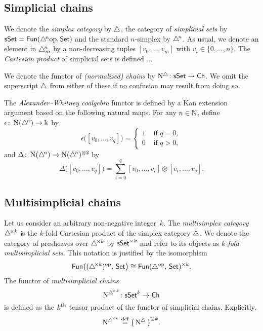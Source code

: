 \subsection{Simplicial chains}

We denote the \textit{simplex category} by $\triangle$, the category of \textit{simplicial sets} by $\mathsf{sSet} = \mathsf{Fun}(\triangle^{\!n}\mathrm{op}, \mathsf{Set})$ and the standard $n$-simplex by $\triangle^{\!n}$.
As usual, we denote an element in $\triangle^{\!n}_m$ by a non-decreasing tuples $[v_0, \dots, v_m]$ with $v_i \in \{0, \dots, n\}$.
The \textit{Cartesian product} of simplicial sets is defined ...


We denote the functor of \textit{(normalized) chains} by $\operatorname{N^{\triangle}} \colon \mathsf{sSet} \to \mathsf{Ch}$.
We omit the superscript $\triangle$ from either of these if no confusion may result from doing so.

The \textit{Alexander--Whitney coalgebra} functor is defined by a Kan extension argument based on the following natural maps.
For any $n \in \mathbb{N}$, define $\epsilon \colon \operatorname{N}(\triangle^{\!n}) \to \Bbbk$ by
\[
\epsilon \big( [v_0, \dots, v_q] \big) = \begin{cases} 1 & \text{ if } q = 0, \\ 0 & \text{ if } q>0, \end{cases}
\]
and $\Delta \colon \operatorname{N}(\triangle^{\!n}) \to \operatorname{N}(\triangle^{\!n})^{\otimes2}$ by
\[
\Delta \big( [v_0, \dots, v_q] \big) = \sum_{i=0}^q [v_0, \dots, v_i] \otimes [v_i, \dots, v_q].
\]

\subsection{Multisimplicial chains}

Let us consider an arbitrary non-negative integer~$k$.
The \textit{multisimplex category} $\triangle^{\! \times k}$ is the $k$-fold Cartesian product of the simplex category $\triangle$.
We denote the category of presheaves over $\triangle^{\! \times k}$ by $\mathsf{sSet}^{\times k}$ and refer to its objects as \textit{$k$-fold multisimplicial sets}.
This notation is justified by the isomorphism
\[
\mathsf{Fun} \big( (\triangle^{\! \times k})^{\mathrm{op}},\, \mathsf{Set} \big) \cong
\mathsf{Fun}(\triangle^{\mathrm{op}},\, \mathsf{Set})^{\times k}.
\]
The functor of \textit{multisimplicial chains}
\[
\operatorname{N}^{\triangle^{\! \times k}} \colon \mathsf{sSet}^k \to \mathsf{Ch}
\]
is defined as the $k^{\mathrm{th}}$ tensor product of the functor of simplicial chains.
Explicitly,
\[
\operatorname{N}^{\triangle^{\! \times k}} \stackrel{\mathrm{def}}{=} \big( \operatorname{N^{\triangle}} \big)^{\otimes k}.
\]


